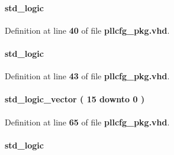 \paragraph[{m\+\_\+odddiv}]{ {\bfseries \textcolor{comment}{std\+\_\+logic}\textcolor{vhdlchar}{ }} \hspace{0.3cm}{\ttfamily [Record]}}\label{classpllcfg__pkg_a849d1b93368e73be711410b19bbe0442}


Definition at line {\bf 40} of file {\bf pllcfg\+\_\+pkg.\+vhd}.

\paragraph[{n\+\_\+byp}]{ {\bfseries \textcolor{comment}{std\+\_\+logic}\textcolor{vhdlchar}{ }} \hspace{0.3cm}{\ttfamily [Record]}}\label{classpllcfg__pkg_a0d833c65ab506649c25a1e6b07f61a13}


Definition at line {\bf 43} of file {\bf pllcfg\+\_\+pkg.\+vhd}.

\paragraph[{n\+\_\+cnt}]{ {\bfseries \textcolor{comment}{std\+\_\+logic\+\_\+vector}\textcolor{vhdlchar}{ }\textcolor{vhdlchar}{(}\textcolor{vhdlchar}{ }\textcolor{vhdlchar}{ } \textcolor{vhdldigit}{15} \textcolor{vhdlchar}{ }\textcolor{keywordflow}{downto}\textcolor{vhdlchar}{ }\textcolor{vhdlchar}{ } \textcolor{vhdldigit}{0} \textcolor{vhdlchar}{ }\textcolor{vhdlchar}{)}\textcolor{vhdlchar}{ }} \hspace{0.3cm}{\ttfamily [Record]}}\label{classpllcfg__pkg_aff6bff2445b0e096987ebbed7b9fc3e4}


Definition at line {\bf 65} of file {\bf pllcfg\+\_\+pkg.\+vhd}.

\paragraph[{n\+\_\+odddiv}]{ {\bfseries \textcolor{comment}{std\+\_\+logic}\textcolor{vhdlchar}{ }} \hspace{0.3cm}{\ttfamily [Record]}}\label{classpllcfg__pkg_a943dfa5f77260507d4fe1fb3550ea56e}


